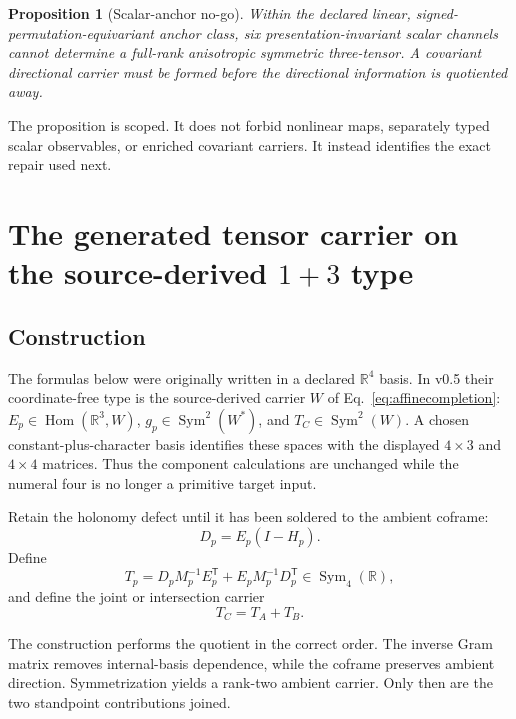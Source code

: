 \documentclass[11pt]{article}
\newtheorem{proposition}[theorem]{Proposition}
\theoremstyle{definition}
\theoremstyle{remark}
\newcommand{\Sym}{\operatorname{Sym}}
\begin{document}
\begin{proposition}[Scalar-anchor no-go]\label{prop:nogo}
Within the declared linear, signed-permutation-equivariant anchor class, six presentation-invariant scalar channels cannot determine a full-rank anisotropic symmetric three-tensor. A covariant directional carrier must be formed before the directional information is quotiented away.
\end{proposition}

The proposition is scoped. It does not forbid nonlinear maps, separately typed scalar observables, or enriched covariant carriers. It instead identifies the exact repair used next.

\section{The generated tensor carrier on the source-derived $1+3$ type}

\subsection{Construction}

The formulas below were originally written in a declared $\mathbb R^4$ basis. In v0.5 their coordinate-free type is the source-derived carrier $W$ of Eq.~\eqref{eq:affinecompletion}: $E_p\in\operatorname{Hom}(\mathbb R^3,W)$, $g_p\in\Sym^2(W^*)$, and $T_C\in\Sym^2(W)$. A chosen constant-plus-character basis identifies these spaces with the displayed $4\times3$ and $4\times4$ matrices. Thus the component calculations are unchanged while the numeral four is no longer a primitive target input.

Retain the holonomy defect until it has been soldered to the ambient coframe:
\begin{equation}\label{eq:defect}
 D_p=E_p(I-H_p).
\end{equation}
Define
\begin{equation}\label{eq:Tp}
 T_p=D_pM_p^{-1}E_p^{\mathsf T}
     +E_pM_p^{-1}D_p^{\mathsf T}\in\Sym_4(\mathbb R),
\end{equation}
and define the joint or intersection carrier
\begin{equation}\label{eq:Tjoint}
 T_C=T_A+T_B.
\end{equation}

The construction performs the quotient in the correct order. The inverse Gram matrix removes internal-basis dependence, while the coframe preserves ambient direction. Symmetrization yields a rank-two ambient carrier. Only then are the two standpoint contributions joined.
\end{document}
